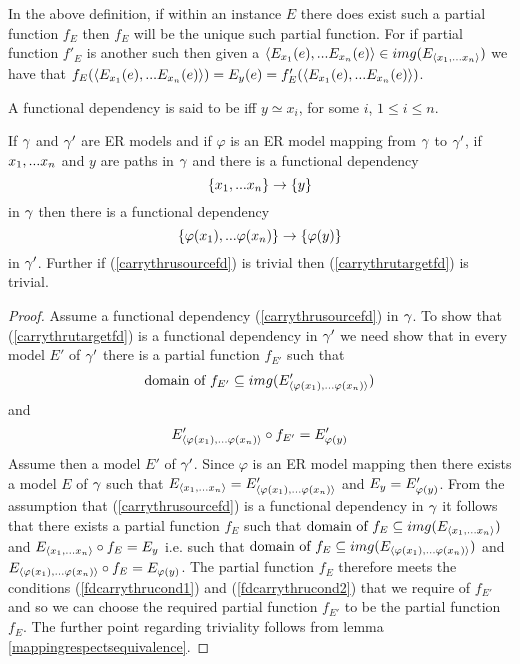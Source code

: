 \begin{remark}
In the above definition, if within an instance $E$ there does exist such a partial function $f_E$ then $f_E$ will be the unique such partial function. For if partial function $f'_E$ is another such then given a $\langle E_{x_1}(e),...E_{x_n}(e)\rangle \in img(E_{\langle x_1,...x_n\rangle})$
we have that $f_E(\langle E_{x_1}(e),...E_{x_n}(e)\rangle)=E_y(e)=f'_E(\langle E_{x_1}(e),...E_{x_n}(e)\rangle)$.
\end{remark}

\begin{definition}
A functional dependency  is said to be  iff $y\simeq x_i$, for some $i$, $1 \leq i \leq n$.
\end{definition}

\begin{lemma}
If $\gamma$ and $\gamma'$ are ER models and  if  $\varphi$ is an ER model mapping from $\gamma$  to $\gamma'$,  if $x_1,...x_n$ and $y$ are paths in $\gamma$
and there is a  functional dependency
\begin{equation}
\label{carrythrusourcefd}
\left\{x_1,...x_n\right\} \rightarrow \left\{y\right\}
\end{equation} 
in $\gamma$ then there is a functional dependency
\begin{equation}
\label{carrythrutargetfd}
\left\{\varphi(x_1),...\varphi(x_n)\right\} \rightarrow \left\{\varphi(y)\right\}
\end{equation}
in $\gamma'$.
Further if (\ref{carrythrusourcefd}) is trivial then (\ref{carrythrutargetfd}) is trivial.
\end{lemma}
\begin{proof}
Assume a functional dependency (\ref{carrythrusourcefd})  in $\gamma$. To show that (\ref{carrythrutargetfd}) is a functional dependency in $\gamma'$
we need show that in every model $E'$ 
of $\gamma'$ there is a partial function $f_{E'}$ such that
\begin{equation}
\label{fdcarrythrucond1}
\mbox{domain of }f_{E'} \subseteq img(E'_{\langle\varphi(x_1),...\varphi(x_n)\rangle})
\end{equation}
and
\begin{equation}
\label{fdcarrythrucond2}
E'_{\langle\varphi(x_1),...\varphi(x_n)\rangle} \circ f_{E'} = E'_{\varphi(y)}
\end{equation}
Assume then a model $E'$ of $\gamma'$. 
Since $\varphi$ is an ER model mapping then there exists a model $E$ of $\gamma$ such that 
$E_{\langle x_1,...x_n\rangle} = E'_{\langle\varphi(x_1),...\varphi(x_n)\rangle}$ and $E_y = E'_{\varphi(y)}$. From the assumption that (\ref{carrythrusourcefd})
is a functional dependency in $\gamma$ it follows that there exists a  partial function $f_E$ such that
$\mbox{domain of }f_{E} \subseteq img(E_{\langle x_1,...x_n\rangle})$
and
$E_{\langle x_1,...x_n\rangle} \circ f_{E} = E_y$ 
i.e. such that 
$\mbox{domain of }f_{E} \subseteq img(E_{\langle\varphi(x_1),...\varphi(x_n)\rangle})$
and
$E_{\langle\varphi(x_1),...\varphi(x_n)\rangle} \circ f_{E} = E_{\varphi(y)}$.  The partial function $f_E$ therefore 
meets the conditions (\ref{fdcarrythrucond1}) and (\ref{fdcarrythrucond2}) that
we require of $f_{E'}$ and so we can choose the required partial function
$f_{E'}$ to be the partial function $f_E$. 
The further point regarding triviality follows from lemma \ref{mappingrespectsequivalence}.
\end{proof}





